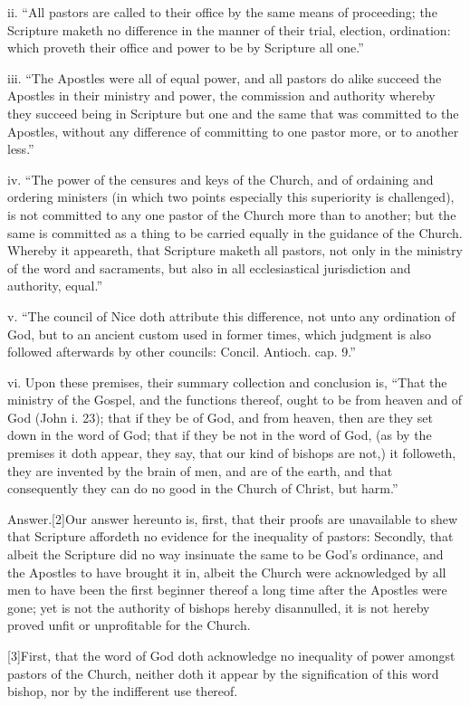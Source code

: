 ii. “All pastors are called to their office by the same means of proceeding; the Scripture maketh no difference in the manner of their trial, election, ordination: which proveth their office and power to be by Scripture all one.”

iii. “The Apostles were all of equal power, and all pastors do alike succeed the Apostles in their ministry and power, the commission and authority whereby they succeed being  in Scripture but one and the same that was committed to the Apostles, without any difference of committing to one pastor more, or to another less.”


iv. “The power of the censures and keys of the Church, and of ordaining and ordering ministers (in which two points especially this superiority is challenged), is not committed to any one pastor of the Church more than to another; but the same is committed as a thing to be carried equally in the guidance of the Church. Whereby it appeareth, that Scripture maketh all pastors, not only in the ministry of the word and sacraments, but also in all ecclesiastical jurisdiction and authority, equal.”

v. “The council of Nice doth attribute this difference, not unto any ordination of God, but to an ancient custom used in former times, which judgment is also followed afterwards by other councils: Concil. Antioch. cap. 9.”

vi. Upon these premises, their summary collection and conclusion is, “That the ministry of the Gospel, and the functions thereof, ought to be from heaven and of God (John i. 23); that if they be of God, and from heaven, then are they set down in the word of God; that if they be not in the word of God, (as by the premises it doth appear, they say, that our kind of bishops are not,) it followeth, they are invented by the brain of men, and are of the earth, and that consequently they can do no good in the Church of Christ, but harm.”

Answer.[2]Our answer hereunto is, first, that their proofs are unavailable to shew that Scripture affordeth no evidence for the inequality of pastors: Secondly, that albeit the Scripture did no way insinuate the same to be God’s ordinance, and  the Apostles to have brought it in,
 albeit the Church were acknowledged by all men to have been the first beginner thereof a long time after the Apostles were gone; yet is not the authority of bishops hereby disannulled, it is not hereby proved unfit or unprofitable for the Church.

[3]First, that the word of God doth acknowledge no inequality of power amongst pastors of the Church, neither doth it appear by the signification of this word bishop, nor by the indifferent use thereof.

